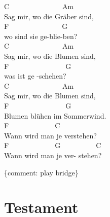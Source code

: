 \documentclass[
  letterpaper,
  a5paper]{memoir}
\begin{document}
C~~~~~~~~~~~~~~~Am~~~~~~~~~~~\\
Sag mir, wo die Gräber sind,\\
F~~~~~~~~~~~~~~~G\\
wo sind sie ge-blie-ben?\\
C~~~~~~~~~~~~~~~Am~~~~~~~~~~~\\
Sag mir, wo die Blumen sind,\\
F~~~~~~~~~~~~~~~~G\\
was ist ge -schehen?\\
C~~~~~~~~~~~~~~~Am~~~~~~~~~~~\\
Sag mir, wo die Blumen sind,\\
F~~~~~~~~~~~~~~~~G\\
Blumen blühen im Sommerwind.\\
F~~~~~~~~~~~~~C~~~~~~~~~~~~~~~~~\\
Wann wird man je verstehen?~~~~~\\
F~~~~~~~~~~~~~G~~~~~~~~~~C\\
Wann wird man je ver- stehen?

\{comment: play bridge\}

\hypertarget{testament}{%
\chapter{Testament}\label{testament}}
\end{document}
